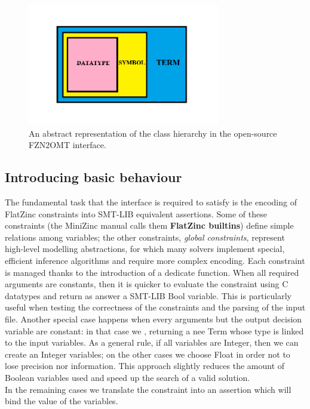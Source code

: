 \begin{figure}
    \centering
    \includegraphics[width=0.75\textwidth]{images/hierarchy.png}
    \caption{An abstract representation of the class hierarchy in the open-source FZN2OMT interface.}
    \label{fig:my_label}
\end{figure}

\subsection{Introducing basic behaviour}

The fundamental task that the interface is required to satisfy is the encoding of FlatZinc constraints into SMT-LIB equivalent assertions. Some of these constraints (the MiniZinc manual calls them \textbf{FlatZinc builtins}) define simple relations among variables; the other constraints, \textit{global constraints}, represent high-level modelling abstractions, for which many solvers implement special, efficient inference algorithms and require more complex encoding. Each constraint is managed thanks to the introduction of a dedicate function. When all required arguments are constants, then it is quicker to evaluate the constraint using C datatypes and return as answer a SMT-LIB Bool variable. This is particularly useful when testing the correctness of the constraints and the parsing of the input file. Another special case happens when every arguments but the output decision variable are constant: in that case we , returning a nee Term whose type is linked to the input variables. As a general rule, if all variables are Integer, then we can create an Integer variables; on the other cases we choose Float in order not to lose precision nor information. This approach slightly reduces the amount of Boolean variables used and speed up the search of a valid solution. \\
In the remaining cases we translate the constraint into an assertion which will bind the value of the variables.

